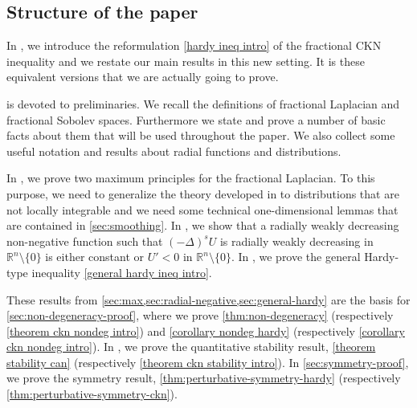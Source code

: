\documentclass[10pt, reqno]{amsart}
\newcounter{results}[section] %
\theoremstyle{plain}
\theoremstyle{remark}
\theoremstyle{definition}
\numberwithin{equation}{section}
\theoremstyle{plain}
\newcommand{\R}{\ensuremath{\mathbb R}} %
\newcommand{\lapl}{\ensuremath{\Delta}}
\begin{document}
\subsection{Structure of the paper}

In , we introduce the reformulation \cref{hardy ineq intro} of the fractional CKN inequality and we restate our main results in this new setting. It is these equivalent versions that we are actually going to prove. 

 is devoted to preliminaries. We recall the definitions of fractional Laplacian and fractional Sobolev spaces. Furthermore we state and prove a number of basic facts about them that will be used throughout the paper. We also collect some useful notation and results about radial functions and distributions.

In , we prove two maximum principles for the fractional Laplacian.
To this purpose, we need to generalize the theory developed in \cite[Section 2.2]{Silvestre2007} to distributions that are not locally integrable and we need some technical one-dimensional lemmas that are contained in \cref{sec:smoothing}.
In , we show that a radially weakly decreasing non-negative function such that $(-\lapl)^sU$ is radially weakly decreasing in $\R^n\setminus\{0\}$ is either constant or $U'<0$ in $\R^n\setminus\{0\}$. In , we prove the general Hardy-type inequality \cref{general hardy ineq intro}. 

These results from \cref{sec:max,sec:radial-negative,sec:general-hardy} are the basis for \cref{sec:non-degeneracy-proof}, where we prove \cref{thm:non-degeneracy} (respectively \cref{theorem ckn nondeg intro}) and \cref{corollary nondeg hardy} (respectively \cref{corollary ckn nondeg intro}).
In , we prove the quantitative stability result, \cref{theorem stability can} (respectively \cref{theorem ckn stability intro}). 
In \cref{sec:symmetry-proof}, we prove the symmetry result, \cref{thm:perturbative-symmetry-hardy} (respectively \cref{thm:perturbative-symmetry-ckn}). 


\end{document}
